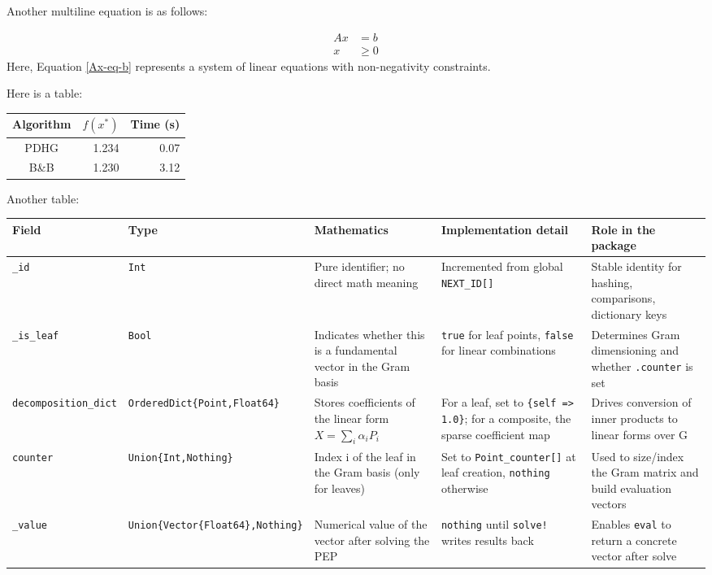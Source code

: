 \documentclass{article}
\begin{document}
Another multiline equation is as follows: 

\begin{equation}\label{Ax-eq-b}
\begin{aligned}
  Ax &= b \\
  x &\ge 0
\end{aligned}
\end{equation}
Here, Equation \eqref{Ax-eq-b} represents a system of linear equations with non-negativity constraints.

Here is a table:

\begin{tabular}{crr}
\toprule
Algorithm & $f(x^*)$ & Time (s) \\
\midrule
PDHG & 1.234 & 0.07 \\
B\&B & 1.230 & 3.12 \\
\bottomrule
\end{tabular}


Another table: 


\begin{tabularx}{\textwidth}{XXXXX}
\toprule
Field & Type & Mathematics & Implementation detail & Role in the package \\
\midrule
\texttt{\_id} & \texttt{Int} & Pure identifier; no direct math meaning & Incremented from global \texttt{NEXT\_ID[]} & Stable identity for hashing, comparisons, dictionary keys \\
\texttt{\_is\_leaf} & \texttt{Bool} & Indicates whether this is a fundamental vector in the Gram basis & \texttt{true} for leaf points, \texttt{false} for linear combinations & Determines Gram dimensioning and whether \texttt{.counter} is set \\
\texttt{decomposition\_dict} & \texttt{OrderedDict\{Point,Float64\}} & Stores coefficients of the linear form $X=\sum_i \alpha_i P_i$ & For a leaf, set to \texttt{\{self => 1.0\}}; for a composite, the sparse coefficient map & Drives conversion of inner products to linear forms over G \\
\texttt{counter} & \texttt{Union\{Int,Nothing\}} & Index i of the leaf in the Gram basis (only for leaves) & Set to \texttt{Point\_counter[]} at leaf creation, \texttt{nothing} otherwise & Used to size/index the Gram matrix and build evaluation vectors \\
\texttt{\_value} & \texttt{Union\{Vector\{Float64\},Nothing\}} & Numerical value of the vector after solving the PEP & \texttt{nothing} until \texttt{solve!} writes results back & Enables \texttt{eval} to return a concrete vector after solve \\
\bottomrule
\end{tabularx}
\end{document}
